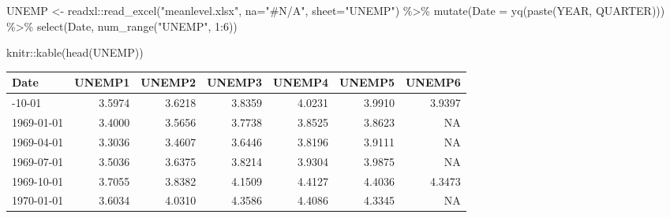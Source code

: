 \documentclass[
  letterpaper,
]{book}
\newenvironment{Shaded}{\begin{snugshade}}{\end{snugshade}}
\newcommand{\AttributeTok}[1]{\textcolor[rgb]{0.40,0.45,0.13}{#1}}
\newcommand{\DecValTok}[1]{\textcolor[rgb]{0.68,0.00,0.00}{#1}}
\newcommand{\FunctionTok}[1]{\textcolor[rgb]{0.28,0.35,0.67}{#1}}
\newcommand{\NormalTok}[1]{\textcolor[rgb]{0.00,0.23,0.31}{#1}}
\newcommand{\OtherTok}[1]{\textcolor[rgb]{0.00,0.23,0.31}{#1}}
\newcommand{\SpecialCharTok}[1]{\textcolor[rgb]{0.37,0.37,0.37}{#1}}
\newcommand{\StringTok}[1]{\textcolor[rgb]{0.13,0.47,0.30}{#1}}
\begin{document}
\begin{Shaded}
\begin{Highlighting}[]
\NormalTok{UNEMP }\OtherTok{\textless{}{-}}\NormalTok{ readxl}\SpecialCharTok{::}\FunctionTok{read\_excel}\NormalTok{(}\StringTok{"meanlevel.xlsx"}\NormalTok{, }\AttributeTok{na=}\StringTok{"\#N/A"}\NormalTok{, }\AttributeTok{sheet=}\StringTok{"UNEMP"}\NormalTok{) }\SpecialCharTok{\%\textgreater{}\%} 
  \FunctionTok{mutate}\NormalTok{(}\AttributeTok{Date =} \FunctionTok{yq}\NormalTok{(}\FunctionTok{paste}\NormalTok{(YEAR, QUARTER))) }\SpecialCharTok{\%\textgreater{}\%}
  \FunctionTok{select}\NormalTok{(Date, }\FunctionTok{num\_range}\NormalTok{(}\StringTok{"UNEMP"}\NormalTok{, }\DecValTok{1}\SpecialCharTok{:}\DecValTok{6}\NormalTok{))}

\NormalTok{knitr}\SpecialCharTok{::}\FunctionTok{kable}\NormalTok{(}\FunctionTok{head}\NormalTok{(UNEMP))}
\end{Highlighting}
\end{Shaded}

\begin{longtable}[]{@{}lrrrrrr@{}}
\toprule\noalign{}
Date & UNEMP1 & UNEMP2 & UNEMP3 & UNEMP4 & UNEMP5 & UNEMP6 \\
\midrule\noalign{}
\endhead
\bottomrule\noalign{}
\endlastfoot
1968-10-01 & 3.5974 & 3.6218 & 3.8359 & 4.0231 & 3.9910 & 3.9397 \\
1969-01-01 & 3.4000 & 3.5656 & 3.7738 & 3.8525 & 3.8623 & NA \\
1969-04-01 & 3.3036 & 3.4607 & 3.6446 & 3.8196 & 3.9111 & NA \\
1969-07-01 & 3.5036 & 3.6375 & 3.8214 & 3.9304 & 3.9875 & NA \\
1969-10-01 & 3.7055 & 3.8382 & 4.1509 & 4.4127 & 4.4036 & 4.3473 \\
1970-01-01 & 3.6034 & 4.0310 & 4.3586 & 4.4086 & 4.3345 & NA \\
\end{longtable}
\end{document}
